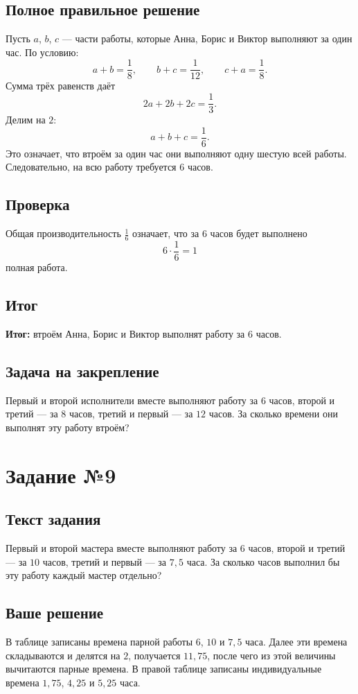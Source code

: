 \documentclass[12pt,a4paper]{article}
\newcommand{\result}{\textcolor{teal!60!black}{\textbf{Итог:}}}
\newcommand{\tasksection}[1]{\section*{Задание №#1}}
\begin{document}
\subsection*{Полное правильное решение}
Пусть $a$, $b$, $c$ --- части работы, которые Анна, Борис и Виктор выполняют за один час. По условию:
\[
a+b=\frac18,\qquad b+c=\frac1{12},\qquad c+a=\frac18.
\]
Сумма трёх равенств даёт
\[
2a+2b+2c=\frac13.
\]
Делим на $2$:
\[
a+b+c=\frac16.
\]
Это означает, что втроём за один час они выполняют одну шестую всей работы. Следовательно, на всю работу требуется $6$ часов.

\subsection*{Проверка}
Общая производительность $\frac16$ означает, что за $6$ часов будет выполнено
\[
6\cdot\frac16=1
\]
полная работа.

\subsection*{Итог}
\result{} втроём Анна, Борис и Виктор выполнят работу за $6$ часов.

\subsection*{Задача на закрепление}
Первый и второй исполнители вместе выполняют работу за $6$ часов, второй и третий --- за $8$ часов, третий и первый --- за $12$ часов. За сколько времени они выполнят эту работу втроём?

\newpage
{}\label{task:9}
\tasksection{9}
\subsection*{Текст задания}
Первый и второй мастера вместе выполняют работу за $6$ часов, второй и третий --- за $10$ часов, третий и первый --- за $7{,}5$ часа. За сколько часов выполнил бы эту работу каждый мастер отдельно?

\subsection*{Ваше решение}
В таблице записаны времена парной работы $6$, $10$ и $7{,}5$ часа. Далее эти времена складываются и делятся на $2$, получается $11{,}75$, после чего из этой величины вычитаются парные времена. В правой таблице записаны индивидуальные времена $1{,}75$, $4{,}25$ и $5{,}25$ часа.
\end{document}

